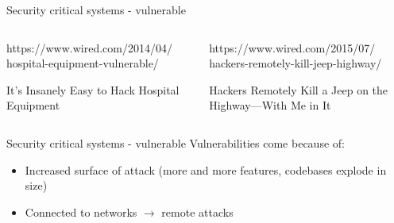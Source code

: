 \documentclass{beamer}
\begin{document}
\begin{frame}{Security critical systems - vulnerable}
    \begin{columns}
        \begin{column}{0.5\textwidth}
            https://www.wired.com/2014/04/ hospital-equipment-vulnerable/

            It's Insanely Easy to Hack Hospital Equipment
        \end{column}
        \begin{column}{0.5\textwidth}
            https://www.wired.com/2015/07/ hackers-remotely-kill-jeep-highway/

            Hackers Remotely Kill a Jeep on the Highway—With Me in It
        \end{column}
    \end{columns}
\end{frame}

\begin{frame}{Security critical systems - vulnerable}
    Vulnerabilities come because of:
    \begin{itemize}
        \item Increased surface of attack (more and more features, codebases explode in size)
        \item Connected to networks $\rightarrow$ remote attacks
    \end{itemize}

\end{frame}
\end{document}
